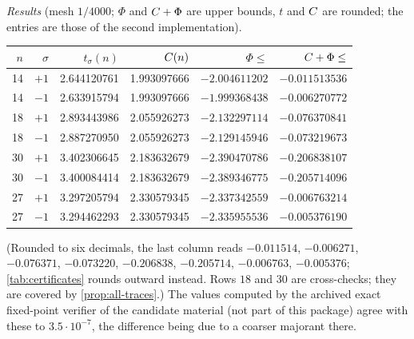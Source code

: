\emph{Results} (mesh $1/4000$; $\Phi$ and $C+\Phi$ are upper bounds, $t$ and $C$ are rounded; the entries are those of the second implementation).
\begin{center}\small
\begin{tabular}{@{}rrrrrr@{}}
\toprule
$n$ & $\sigma$ & $t_\sigma(n)$ & $C(n)$ & $\Phi\le$ & $C+\Phi\le$ \\
\midrule
14 & $+1$ & 2.644120761 & 1.993097666 & $-2.004611202$ & $-0.011513536$ \\
14 & $-1$ & 2.633915794 & 1.993097666 & $-1.999368438$ & $-0.006270772$ \\
18 & $+1$ & 2.893443986 & 2.055926273 & $-2.132297114$ & $-0.076370841$ \\
18 & $-1$ & 2.887270950 & 2.055926273 & $-2.129145946$ & $-0.073219673$ \\
30 & $+1$ & 3.402306645 & 2.183632679 & $-2.390470786$ & $-0.206838107$ \\
30 & $-1$ & 3.400084414 & 2.183632679 & $-2.389346775$ & $-0.205714096$ \\
27 & $+1$ & 3.297205794 & 2.330579345 & $-2.337342559$ & $-0.006763214$ \\
27 & $-1$ & 3.294462293 & 2.330579345 & $-2.335955536$ & $-0.005376190$ \\
\bottomrule
\end{tabular}
\end{center}
(Rounded to six decimals, the last column reads $-0.011514$, $-0.006271$, $-0.076371$, $-0.073220$, $-0.206838$, $-0.205714$, $-0.006763$, $-0.005376$;
\cref{tab:certificates} rounds outward instead. Rows $18$ and $30$ are cross-checks; they are covered by \cref{prop:all-traces}.) The values computed by the
archived exact fixed-point verifier of the candidate material (not part of this package) agree with these to
$3.5\cdot10^{-7}$, the difference being due to a coarser majorant there.
